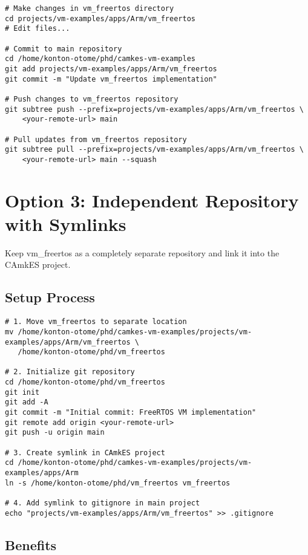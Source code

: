 \documentclass[11pt,a4paper]{article}
\begin{document}
\begin{lstlisting}[caption=Working with Subtrees]
# Make changes in vm_freertos directory
cd projects/vm-examples/apps/Arm/vm_freertos
# Edit files...

# Commit to main repository
cd /home/konton-otome/phd/camkes-vm-examples
git add projects/vm-examples/apps/Arm/vm_freertos
git commit -m "Update vm_freertos implementation"

# Push changes to vm_freertos repository
git subtree push --prefix=projects/vm-examples/apps/Arm/vm_freertos \
    <your-remote-url> main

# Pull updates from vm_freertos repository
git subtree pull --prefix=projects/vm-examples/apps/Arm/vm_freertos \
    <your-remote-url> main --squash
\end{lstlisting}

\section{Option 3: Independent Repository with Symlinks}

Keep vm\_freertos as a completely separate repository and link it into the CAmkES project.

\subsection{Setup Process}

\begin{lstlisting}[caption=Independent Repository Setup]
# 1. Move vm_freertos to separate location
mv /home/konton-otome/phd/camkes-vm-examples/projects/vm-examples/apps/Arm/vm_freertos \
   /home/konton-otome/phd/vm_freertos

# 2. Initialize git repository
cd /home/konton-otome/phd/vm_freertos
git init
git add -A
git commit -m "Initial commit: FreeRTOS VM implementation"
git remote add origin <your-remote-url>
git push -u origin main

# 3. Create symlink in CAmkES project
cd /home/konton-otome/phd/camkes-vm-examples/projects/vm-examples/apps/Arm
ln -s /home/konton-otome/phd/vm_freertos vm_freertos

# 4. Add symlink to gitignore in main project
echo "projects/vm-examples/apps/Arm/vm_freertos" >> .gitignore
\end{lstlisting}

\subsection{Benefits}
\end{document}
